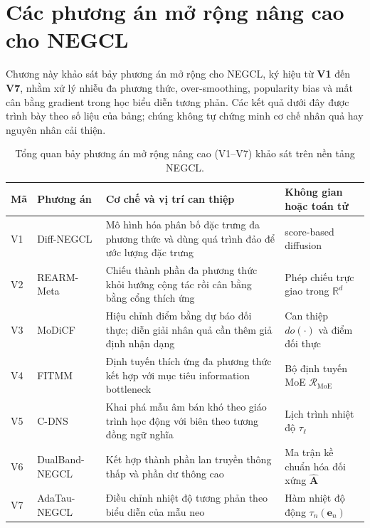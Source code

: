 
\section{Các phương án mở rộng nâng cao cho NEGCL}
\label{sec:negcl_advanced_extensions}

Chương này khảo sát bảy phương án mở rộng cho NEGCL, ký hiệu từ \textbf{V1} đến \textbf{V7}, nhằm xử lý nhiễu đa phương thức, over-smoothing, popularity bias và mất cân bằng gradient trong học biểu diễn tương phản. Các kết quả dưới đây được trình bày theo số liệu của bảng; chúng không tự chứng minh cơ chế nhân quả hay nguyên nhân cải thiện.

\begin{table}[H]
\centering
\renewcommand{\baselinestretch}{1}
\small
\setlength{\tabcolsep}{4pt}
\renewcommand{\arraystretch}{1.18}
\caption{Tổng quan bảy phương án mở rộng nâng cao (V1--V7) khảo sát trên nền tảng NEGCL.}
\label{tab:negcl_v1_v7_overview}
\begin{tabularx}{\linewidth}{@{}
    >{\centering\arraybackslash}p{0.8cm}
    >{\raggedright\arraybackslash}p{3.2cm}
    X
    >{\raggedright\arraybackslash}p{3.2cm}@{}}
\toprule
\textbf{Mã} & \textbf{Phương án} & \textbf{Cơ chế và vị trí can thiệp} & \textbf{Không gian hoặc toán tử} \\
\midrule
V1 & Diff-NEGCL & Mô hình hóa phân bố đặc trưng đa phương thức và dùng quá trình đảo để ước lượng đặc trưng & score-based diffusion \\
V2 & REARM-Meta & Chiếu thành phần đa phương thức khỏi hướng cộng tác rồi cân bằng bằng cổng thích ứng & Phép chiếu trực giao trong $\mathbb{R}^d$ \\
V3 & MoDiCF & Hiệu chỉnh điểm bằng dự báo đối thực; diễn giải nhân quả cần thêm giả định nhận dạng & Can thiệp $do(\cdot)$ và điểm đối thực \\
V4 & FITMM & Định tuyến thích ứng đa phương thức kết hợp với mục tiêu information bottleneck & Bộ định tuyến MoE $\mathcal{R}_{\text{MoE}}$ \\
V5 & C-DNS & Khai phá mẫu âm bán khó theo giáo trình học động với biên theo tương đồng ngữ nghĩa & Lịch trình nhiệt độ $\tau_\ell$ \\
V6 & DualBand-NEGCL & Kết hợp thành phần lan truyền thông thấp và phần dư thông cao & Ma trận kề chuẩn hóa đối xứng $\hat{\mathbf{A}}$ \\
V7 & AdaTau-NEGCL & Điều chỉnh nhiệt độ tương phản theo biểu diễn của mẫu neo & Hàm nhiệt độ động $\tau_n(\mathbf{e}_n)$ \\
\bottomrule
\end{tabularx}
\end{table}

